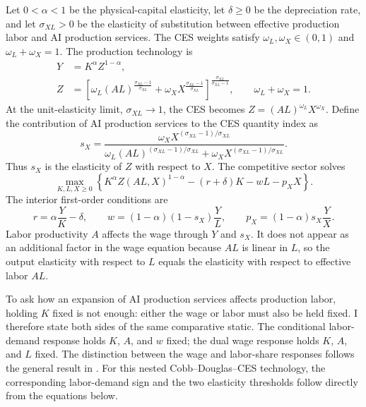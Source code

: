 Let \(0<\alpha<1\) be the physical-capital elasticity, let \(\delta\geq0\) be
the depreciation rate, and let \(\sigma_{XL}>0\) be the elasticity of
substitution between effective production labor and AI production services. The
CES weights satisfy \(\omega_L,\omega_X\in(0,1)\) and
\(\omega_L+\omega_X=1\). The production technology is
\begin{align}
 Y&=K^\alpha Z^{1-\alpha},\\
 Z&=\left[\omega_L (AL)^{\frac{\sigma_{XL}-1}{\sigma_{XL}}}
 +\omega_X X^{\frac{\sigma_{XL}-1}{\sigma_{XL}}}\right]^{
 \frac{\sigma_{XL}}{\sigma_{XL}-1}},
 \qquad \omega_L+\omega_X=1.
 \label{eq:axm-final-production}
\end{align}
At the unit-elasticity limit, \(\sigma_{XL}\to1\), the CES becomes
\(Z=(AL)^{\omega_L}X^{\omega_X}\). Define the contribution of AI production
services to the CES quantity index as
\begin{equation}
 s_X=\frac{\omega_X X^{(\sigma_{XL}-1)/\sigma_{XL}}}
 {\omega_L (AL)^{(\sigma_{XL}-1)/\sigma_{XL}}
 +\omega_X X^{(\sigma_{XL}-1)/\sigma_{XL}}}.
 \label{eq:axm-sx}
\end{equation}
Thus \(s_X\) is the elasticity of \(Z\) with respect to \(X\). The competitive
sector solves
\begin{equation}
 \max_{K,L,X\geq0}\left\{K^\alpha Z(AL,X)^{1-\alpha}
 -(r+\delta)K-wL-p_XX\right\}.
 \label{eq:axm-final-firm-problem}
\end{equation}
The interior first-order conditions are
\begin{equation}
 r=\alpha\frac{Y}{K}-\delta,\qquad
 w=(1-\alpha)(1-s_X)\frac{Y}{L},\qquad
 p_X=(1-\alpha)s_X\frac{Y}{X}.
 \label{eq:axm-factor-prices}
\end{equation}
Labor productivity \(A\) affects the wage through \(Y\) and \(s_X\). It does
not appear as an additional factor in the wage equation because \(AL\) is
linear in \(L\), so the output elasticity with respect to \(L\) equals the
elasticity with respect to effective labor \(AL\).

To ask how an expansion of AI production services affects production labor,
holding \(K\) fixed is not enough: either the wage or labor must also be held
fixed. I therefore state both sides of the same comparative static. The
conditional labor-demand response holds \(K\), \(A\), and \(w\) fixed; the dual
wage response holds \(K\), \(A\), and \(L\) fixed. The distinction between the
wage and labor-share responses follows the general result in
\citet[Theorem~1]{autorkausik2026}. For this nested Cobb--Douglas--CES
technology, the corresponding labor-demand sign and the two elasticity
thresholds follow directly from the equations below.

